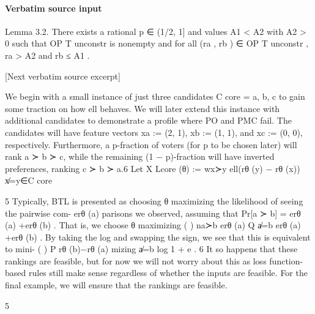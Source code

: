 \documentclass[10pt]{article}
\begin{document}
\paragraph{Verbatim source input}
\begin{ReviewVerbatim}
Lemma 3.2. There exists a rational p ∈ (1/2, 1] and values A1 < A2 with A2 > 0 such that
OP T unconstr is nonempty and for all (ra , rb ) ∈ OP T unconstr , ra > A2 and rb ≤ A1 .

[Next verbatim source excerpt]

We begin with a small instance of just three candidates C core = {a, b, c} to gain some traction on
how ell behaves. We will later extend this instance with additional candidates to demonstrate a profile
where PO and PMC fail. The candidates will have feature vectors xa := (2, 1), xb := (1, 1), and
xc := (0, 0), respectively. Furthermore, a p-fraction of voters (for p to be chosen later) will rank
a ≻ b ≻ c, while the remaining (1 − p)-fraction will have inverted preferences, ranking c ≻ b ≻ a.6
Let                                              X
                              Lcore (θ) :=                  wx≻y ell(rθ (y) − rθ (x))
                                              x̸=y∈C core

      5
     Typically, BTL is presented as choosing θ maximizing the likelihood of seeing the pairwise com-
                                                                erθ (a)
parisons we observed, assuming that Pr[a ≻ b] = erθ (a)           +erθ (b)
                                                                           . That is, we choose θ maximizing
       (                ) na≻b
            erθ (a)
Q
  a̸=b erθ (a) +erθ (b)         . By taking the log and swapping the sign, we see that this is equivalent to mini-
                    (                     )
        P                   rθ (b)−rθ (a)
mizing a̸=b log 1 + e                      .
    6
      It so happens that these rankings are feasible, but for now we will not worry about this as loss function-
based rules still make sense regardless of whether the inputs are feasible. For the final example, we will ensure
that the rankings are feasible.


                                                        5


\end{ReviewVerbatim}
\end{document}
